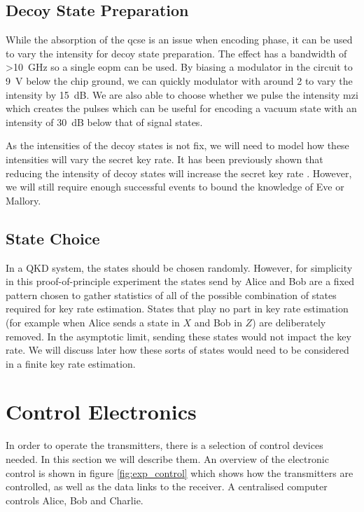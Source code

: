 \subsection{Decoy State Preparation}

While the absorption of the \ac{qcse} is an issue when encoding phase, it can be used to vary the intensity for decoy state preparation. The effect has a bandwidth of \SI{>10}{\GHz} so a single \ac{eopm} can be used. By biasing a modulator in the circuit to \SI{9}{\V} below the chip ground, we can quickly modulator with around \SI{2}{\Vpp} to vary the intensity by \SI{15}{dB}. We are also able to choose whether we pulse the intensity \ac{mzi} which creates the pulses which can be useful for encoding a vacuum state with an intensity of \SI{30}{dB} below that of signal states.

As the intensities of the decoy states is not fix, we will need to model how these intensities will vary the secret key rate. It has been previously shown that reducing the intensity of decoy states will increase the secret key rate \cite{Chan2014}. However, we will still require enough successful events to bound the knowledge of Eve or Mallory.

\subsection{State Choice}

In a \ac{QKD} system, the states should be chosen randomly. However, for simplicity in this proof-of-principle experiment the states send by Alice and Bob are a fixed pattern chosen to gather statistics of all of the possible combination of states required for key rate estimation. States that play no part in key rate estimation (for example when Alice sends a state in $X$ and Bob in $Z$) are deliberately removed. In the asymptotic limit, sending these states would not impact the key rate. We will discuss later how these sorts of states would need to be considered in a finite key rate estimation.

\section{Control Electronics}

In order to operate the transmitters, there is a selection of control devices needed. In this section we will describe them. An overview of the electronic control is shown in figure \ref{fig:exp_control} which shows how the transmitters are controlled, as well as the data links to the receiver. A centralised computer controls Alice, Bob and Charlie. 

